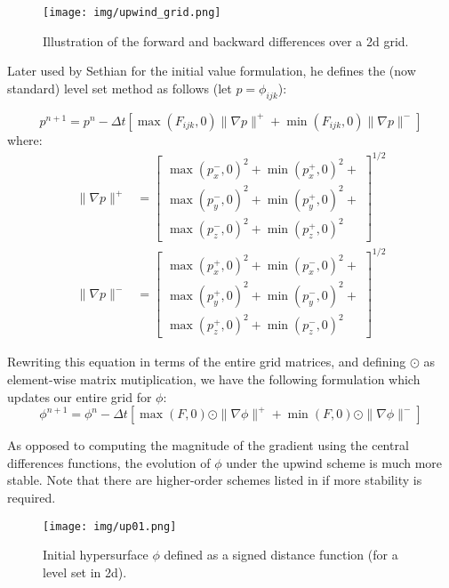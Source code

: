 \documentclass{article}
\begin{document}
\begin{figure}[htb]
  \centering
  \texttt{[image: img/upwind\_grid.png]}
  \caption{Illustration of the forward and backward differences over a 2d grid.}    
\end{figure}


Later used by Sethian\cite{sethian1999level} \cite{sethian1999advancing} for the
initial value formulation, he defines the (now standard) level set method as
follows (let $ p = \phi_{ijk}$):

\[
p^{n+1} = p^{n} - \Delta t [ \max(F_{ijk}, 0) \| \nabla p \|^{+} + \min(F_{ijk},
0) \| \nabla p \|^{-} ]
\]
where:
\begin{align}
    \| \nabla p \|^{+} & = 
    \begin{bmatrix}
        \max(p^{-}_x, 0)^2 + \min(p^{+}_x, 0)^2 + \\
        \max(p^{-}_y, 0)^2 + \min(p^{+}_y, 0)^2 + \\
        \max(p^{-}_z, 0)^2 + \min(p^{+}_z, 0)^2
    \end{bmatrix}^{1/2}  \\
    \| \nabla p \|^{-} & = 
    \begin{bmatrix}
        \max(p^{+}_x, 0)^2 + \min(p^{-}_x, 0)^2 + \\
        \max(p^{+}_y, 0)^2 + \min(p^{-}_y, 0)^2 + \\
        \max(p^{+}_z, 0)^2 + \min(p^{-}_z, 0)^2
    \end{bmatrix}^{1/2} 
\end{align}

Rewriting this equation in terms of the entire grid matrices, and defining
$\odot$ as element-wise matrix mutiplication, we have the following formulation
which updates our entire grid for $\phi$:
\[
\phi^{n+1} = \phi^{n} - \Delta t [ \max(F, 0) \odot \| \nabla \phi \|^{+} +
\min(F, 0) \odot \| \nabla \phi \|^{-} ]
\]

As opposed to computing the magnitude of the gradient using the central
differences functions, the evolution of $\phi$ under the upwind scheme is much
more stable. Note that there are higher-order schemes listed in
\cite{sethian1999level} if more stability is required.

\begin{figure}[H]
  \centering
  \texttt{[image: img/up01.png]}
  \caption{Initial hypersurface $\phi$ defined as a signed distance function
  (for a level set in 2d).}    
\end{figure}
\end{document}
